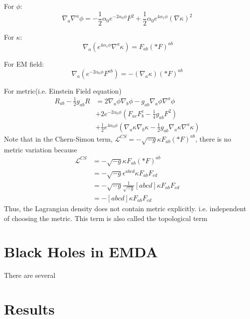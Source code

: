 \documentclass[%
 reprint,
 amsmath,amssymb,
 aps,
]{revtex4-1}
\begin{document}
For $\phi$:
\begin{equation}
\nabla_a \nabla^a \phi = -\frac{1}{2} \alpha_0 e^{-2 \alpha_0 \phi} F^2 + \frac{1}{2} \alpha_0 e^{4 \alpha_1 \phi} (\nabla \kappa)^2
\end{equation}

For $\kappa$:
\begin{equation}\
\nabla_a \left(e^{4 \alpha_1 \phi} \nabla^a \kappa \right) = F_{ab} (\ast F)^{ab}
\end{equation}

For EM field:
\begin{equation}
\nabla_a \left(e^{-2 \alpha_0 \phi} F^{ab}\right) = - (\nabla_a \kappa) (\ast F)^{ab}
\end{equation}

For metric(i.e. Einstein Field equation)
\begin{align}
R_{ab} -\frac{1}{2} g_{ab} R &= 2 \nabla_a \phi \nabla_b \phi - g_{ab} \nabla_a \phi \nabla^a \phi \nonumber \\
					   &+ 2 e^{-2 \alpha_0 \phi} ( F_{ac} F_b^c -\frac{1}{4} g_{ab} F^2)\nonumber \\
					   & + \frac{1}{2} e^{4 \alpha_0 \phi} (\nabla_a \kappa \nabla_b \kappa -\frac{1}{2} g_{ab} \nabla_a \kappa \nabla^a \kappa) 
\end{align}
Note that in the Chern-Simon term, $\mathcal{L}^{CS}= - \sqrt{-g} \kappa F_{ab} (\ast F)^{ab}$, there is no metric variation because 
\begin{align}
\mathcal{L}^{CS} &= - \sqrt{-g} \kappa F_{ab} (\ast F)^{ab} \nonumber \\
			   &=	- \sqrt{-g} \epsilon^{abcd}\kappa F_{ab} F_{cd} \nonumber \\
			   & =- \sqrt{-g} \frac{1}{\sqrt{-g}} \left[abcd\right] \kappa F_{ab} F_{cd} \nonumber \\
			   & =- \left[abcd\right] \kappa F_{ab} F_{cd} \nonumber
\end{align}
Thus, the Lagrangian density does not contain metric explicitly. i.e. independent of choosing the metric. This term is also called the topological term


\section{Black Holes in EMDA}
There are several 

\section{Results}
\end{document}
